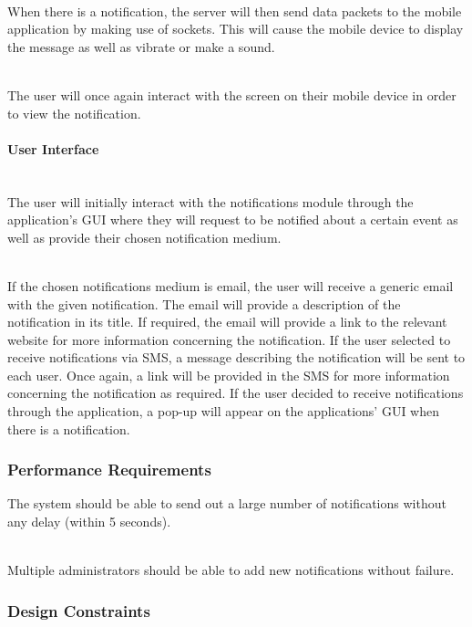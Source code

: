 \documentclass[runningheads,a4paper]{article}
\begin{document}
\mbox{}\\
When there is a notification, the server will then send data packets to the mobile application by making use of sockets. This will cause the mobile device to display the message as well as vibrate or make a sound. 

\mbox{}\\
The user will once again interact with the screen on their mobile device in order to view the notification.

\paragraph{User Interface}
\mbox{}\\
The user will initially interact with the notifications module through the application’s GUI where they will request to be notified about a certain event as well as provide their chosen notification medium. 

\mbox{}\\
If the chosen notifications medium is email, the user will receive a generic email with the given notification. The email will provide a description of the notification in its title. If required, the email will provide a link to the relevant website for more information concerning the notification. If the user selected to receive notifications via SMS, a message describing the notification will be sent to each user. Once again, a link will be provided in the SMS for more information concerning the notification as required. If the user decided to receive notifications through the application, a pop-up will appear on the applications’ GUI when there is a notification. 

\subsubsection{Performance Requirements}

The system should be able to send out a large number of notifications without any delay (within 5 seconds).

\\

Multiple administrators should be able to add new notifications without failure.



\subsubsection{Design Constraints}
\end{document}
